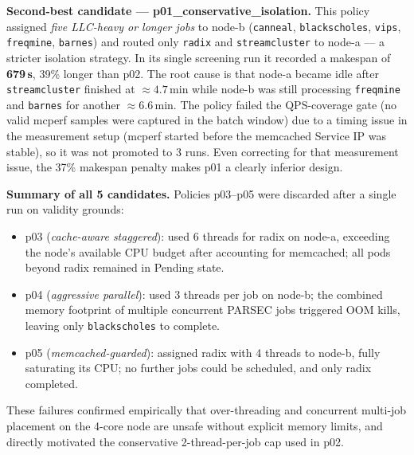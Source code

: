 \textbf{Second-best candidate — p01\_conservative\_isolation.}
This policy assigned \emph{five LLC-heavy or longer jobs} to node-b
(\texttt{canneal}, \texttt{blackscholes}, \texttt{vips},
\texttt{freqmine}, \texttt{barnes}) and routed only \texttt{radix} and
\texttt{streamcluster} to node-a — a stricter isolation strategy.
In its single screening run it recorded a makespan of \textbf{679\,s},
39\% longer than p02.
The root cause is that node-a became idle after \texttt{streamcluster}
finished at ${\approx}4.7$\,min while node-b was still processing
\texttt{freqmine} and \texttt{barnes} for another ${\approx}6.6$\,min.
The policy failed the QPS-coverage gate (no valid mcperf samples were
captured in the batch window) due to a timing issue in the measurement
setup (mcperf started before the memcached Service IP was stable), so it
was not promoted to 3 runs.
Even correcting for that measurement issue, the 37\% makespan penalty makes
p01 a clearly inferior design.

\textbf{Summary of all 5 candidates.}
Policies p03–p05 were discarded after a single run on validity grounds:
\begin{itemize}
  \item p03 (\emph{cache-aware staggered}): used 6 threads for radix on
    node-a, exceeding the node's available CPU budget after accounting for
    memcached; all pods beyond radix remained in Pending state.
  \item p04 (\emph{aggressive parallel}): used 3 threads per job on node-b;
    the combined memory footprint of multiple concurrent PARSEC jobs
    triggered OOM kills, leaving only \texttt{blackscholes} to complete.
  \item p05 (\emph{memcached-guarded}): assigned radix with 4 threads to
    node-b, fully saturating its CPU; no further jobs could be scheduled,
    and only radix completed.
\end{itemize}
These failures confirmed empirically that over-threading and concurrent
multi-job placement on the 4-core node are unsafe without explicit memory
limits, and directly motivated the conservative 2-thread-per-job cap used
in p02.

